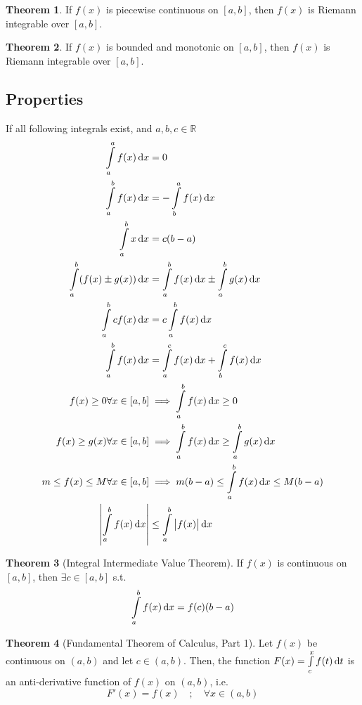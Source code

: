 \documentclass[fleqn, a4paper, 12pt]{article}
\theoremstyle{definition}
\theoremstyle{theorem}
\newtheorem{theorem}{Theorem}
\theoremstyle{remark}
\begin{document}
\begin{theorem}
	If $f(x)$ is piecewise continuous on $[a, b]$, then $f(x)$ is Riemann integrable over $[a, b]$.
\end{theorem}

\begin{theorem}
	If $f(x)$ is bounded and monotonic on $[a, b]$, then $f(x)$ is Riemann integrable over $[a, b]$.
\end{theorem}

\subsection{Properties}
If all following integrals exist, and $a, b, c \in \mathbb{R}$
\begin{align*}
	\int\limits_{a}^{a} f(x) \dif x &= 0\\
	\int\limits_{a}^{b} f(x) \dif x &= - \int\limits_{b}^{a} f(x) \dif x\\
	\int\limits_{a}^{b} x \dif x &= c (b - a)\\
	\int\limits_{a}^{b} (f(x) \pm g(x)) \dif x &= \int\limits_{a}^{b} f(x) \dif x \pm \int\limits_{a}^{b} g(x) \dif x\\
	\int\limits_{a}^{b} c f(x) \dif x &= c \int\limits_{a}^{b} f(x) \dif x\\
	\int\limits_{a}^{b} f(x) \dif x &= \int\limits_{a}^{c} f(x) \dif x + \int\limits_{b}^{c} f(x) \dif x\\
	f(x)  \geq 0 \forall x \in [a, b] &\implies \int\limits_{a}^{b} f(x) \dif x \geq 0\\
	f(x)  \geq g(x) \forall x \in [a, b] &\implies \int\limits_{a}^{b} f(x) \dif x \geq \int\limits_{a}^{b} g(x) \dif x\\
	m \leq f(x) \leq M \forall x \in [a, b] &\implies m (b - a) \leq \int\limits_{a}^{b} f(x) \dif x \leq M (b - a)\\
	\left| \int\limits_{a}^{b} f(x) \dif x \right| &\leq \int\limits_{a}^{b} \left| f(x) \right| \dif x
\end{align*}

\begin{theorem}[Integral Intermediate Value Theorem] \label{Integral Intermediate Value Theorem}
	If $f(x)$ is continuous on $[a, b]$, then $\exists c \in [a, b]$ s.t. 
	\begin{equation*}
		\int\limits_{a}^{b} f(x) \dif x = f(c) (b - a)
	\end{equation*}
\end{theorem}

\begin{theorem}[Fundamental Theorem of Calculus, Part 1]\label{Fundamental Theorem of Calculus, Part 1}
	Let $f(x)$ be continuous on $(a, b)$ and let $c \in (a, b)$. Then, the function $F(x) = \int\limits_{c}^{x} f(t) \dif t$ is an anti-derivative function of $f(x)$ on $(a, b)$, i.e.
	\begin{equation*}
		F'(x) = f(x) \quad ; \quad \forall x \in (a, b)
	\end{equation*}
\end{theorem}
\end{document}
